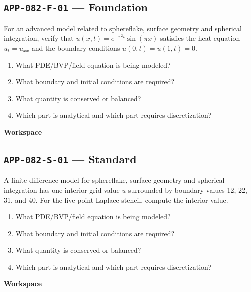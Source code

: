 \documentclass[11pt]{book}
\newcommand{\pid}[1]{\texttt{#1}}
\newcommand{\workspace}{\par\vspace{0.7in}\hrulefill\par\vspace{0.55in}\hrulefill\par}
\begin{document}
\subsection*{\pid{APP-082-F-01} — Foundation}
\begin{problembox}
For an advanced model related to sphereflake, surface geometry and spherical integration, verify that $u(x,t)=e^{-\pi^2t}\sin(\pi x)$ satisfies the heat equation $u_t=u_{xx}$ and the boundary conditions $u(0,t)=u(1,t)=0$.
\end{problembox}
\begin{promptbox}\begin{enumerate}
\item What PDE/BVP/field equation is being modeled?
\item What boundary and initial conditions are required?
\item What quantity is conserved or balanced?
\item Which part is analytical and which part requires discretization?
\end{enumerate}\end{promptbox}
\textbf{Workspace}\workspace
{}
\subsection*{\pid{APP-082-S-01} — Standard}
\begin{problembox}
A finite-difference model for sphereflake, surface geometry and spherical integration has one interior grid value $u$ surrounded by boundary values 12, 22, 31, and 40. For the five-point Laplace stencil, compute the interior value.
\end{problembox}
\begin{promptbox}\begin{enumerate}
\item What PDE/BVP/field equation is being modeled?
\item What boundary and initial conditions are required?
\item What quantity is conserved or balanced?
\item Which part is analytical and which part requires discretization?
\end{enumerate}\end{promptbox}
\textbf{Workspace}\workspace
{}
\end{document}
